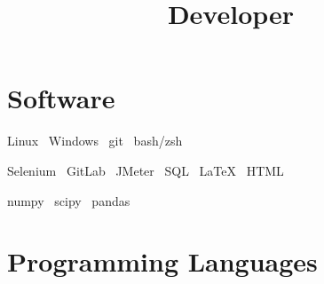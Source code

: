 \documentclass[11pt,a4paper,sans]{moderncv}
\title{Developer}
\def\dot{\textbullet\ }
\begin{document}
\makecvtitle

\section{Software}
\begin{center}
Linux \dot Windows \dot git \dot bash/zsh

Selenium \dot GitLab \dot JMeter \dot SQL \dot LaTeX \dot HTML

numpy \dot scipy \dot pandas
\end{center}

\section{Programming Languages}
\end{document}
